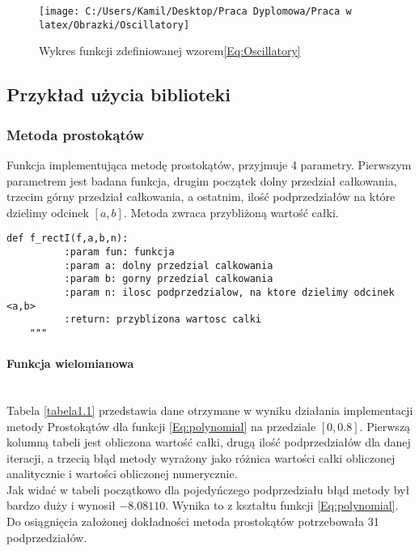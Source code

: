\documentclass[12pt,twoside]{article}
\begin{document}
\begin{figure}[t]
\centering
\texttt{[image: C:/Users/Kamil/Desktop/Praca Dyplomowa/Praca w latex/Obrazki/Oscillatory]}
\caption{Wykres funkcji zdefiniowanej wzorem\eqref{Eq:Oscillatory}}
\end{figure}

\clearpage
\subsection{Przykład użycia biblioteki}


\subsubsection{Metoda prostokątów}
	Funkcja implementująca metodę prostokątów, przyjmuje 4 parametry. Pierwszym parametrem jest badana funkcja, drugim początek dolny przedział całkowania, trzecim górny przedział całkowania, a ostatnim, ilość podprzedziałów na które dzielimy odcinek $[a,b]$. Metoda zwraca przybliżoną wartość całki.
	
\begin{lstlisting}[caption={Kod w języku python implementujący metodę prostokątów}]
def f_rectI(f,a,b,n):
 	      :param fun: funkcja
          :param a: dolny przedzial calkowania
          :param b: gorny przedzial calkowania
          :param n: ilosc podprzedzialow, na ktore dzielimy odcinek <a,b>
          :return: przyblizona wartosc calki
    """
\end{lstlisting}
\label{Listing 6}

\paragraph{Funkcja wielomianowa}\mbox{} \\

Tabela \eqref{tabela1.1} przedstawia dane otrzymane w wyniku działania implementacji metody Prostokątów dla funkcji \eqref{Eq:polynomial} na przedziale $[0,0.8]$.
	Pierwszą kolumną tabeli jest obliczona wartość całki, drugą ilość podprzedziałów dla danej iteracji, a trzecią błąd metody wyrażony jako różnica wartości całki obliczonej 			analitycznie i wartości obliczonej numerycznie.\\
	Jak widać w tabeli początkowo dla pojedyńczego podprzedziału błąd metody był bardzo duży i wynosił $-8.08110$. Wynika to z kształtu funkcji \eqref{Eq:polynomial}.\\
	Do osiągnięcia założonej dokładności metoda prostokątów potrzebowała 31 podprzedziałów.
\end{document}
